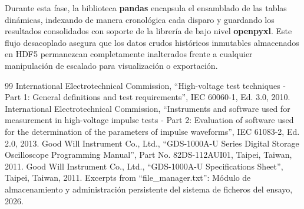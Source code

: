 Durante esta fase, la biblioteca \textbf{pandas} encapsula el ensamblado de las tablas dinámicas, indexando de manera cronológica cada disparo y guardando los resultados consolidados con soporte de la librería de bajo nivel \textbf{openpyxl}. Este flujo desacoplado asegura que los datos crudos históricos inmutables almacenados en HDF5 permanezcan completamente inalterados frente a cualquier manipulación de escalado para visualización o exportación.

\begin{thebibliography}{99}
     International Electrotechnical Commission, ``High-voltage test techniques - Part 1: General definitions and test requirements'', IEC 60060-1, Ed. 3.0, 2010.
     International Electrotechnical Commission, ``Instruments and software used for measurement in high-voltage impulse tests - Part 2: Evaluation of software used for the determination of the parameters of impulse waveforms'', IEC 61083-2, Ed. 2.0, 2013.
     Good Will Instrument Co., Ltd., ``GDS-1000A-U Series Digital Storage Oscilloscope Programming Manual'', Part No. 82DS-112AUI01, Taipei, Taiwan, 2011.
     Good Will Instrument Co., Ltd., ``GDS-1000A-U Specifications Sheet'', Taipei, Taiwan, 2011.
     Excerpts from ``file_manager.txt'': Módulo de almacenamiento y administración persistente del sistema de ficheros del ensayo, 2026.
\end{thebibliography}